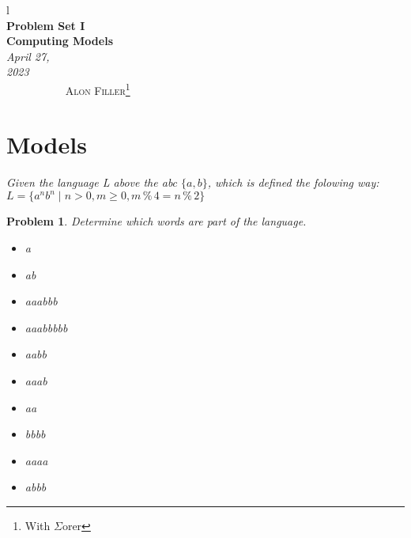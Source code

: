 \documentclass[12pt]{article}
\renewcommand{\=}[1]{\stackrel{#1}{=}} %
\newtheorem{p}{Problem}[section]
\theoremstyle{definition}
\begin{document}
l
{\noindent\Huge\bf  \\[0.5\baselineskip] {\selectfont  Problem Set I}         }\\[2\baselineskip] %
{ {\bf {}\selectfont Computing Models}\\ {\textit{\selectfont     April 27, 2023}}}~~~~~~~~~~~~~~~~~~~~~~~~~~~~~~~~~~~~~~~~~~~~~~~~~~~~~~~~~~~~~~~~~~~~~~~~~~~~~    {\large \textsc{Alon Filler}\footnote{With $\Sigma$orer}} %
\\[1.4\baselineskip] 
\section{Models}
\emph{\newline Given the language L above the abc $\{a, b\}$, which is defined the folowing way:} \newline
  \emph{$L = \{a^{n}b^{n} \mid n > 0, m \ge 0, m \mathbin{\%} 4 = n \mathbin{\%} 2 \}$} \newline
  \begin{p}
  \emph{Determine which words are part of the language.} \newline
    \begin{itemize}
      \item a 
      \item ab 
      \item aaabbb
      \item aaabbbbb
      \item aabb 
      \item aaab
      \item aa
      \item bbbb
      \item aaaa 
      \item abbb
    \end{itemize}
  \end{p}
\end{document}
